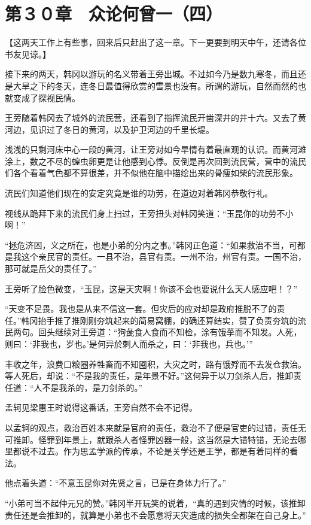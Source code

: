\section{第３０章　众论何曾一（四）}

【这两天工作上有些事，回来后只赶出了这一章。下一更要到明天中午，还请各位书友见谅。】

接下来的两天，韩冈以游玩的名义带着王旁出城。不过如今乃是数九寒冬，而且还是大旱之下的冬天，连冬日最值得欣赏的雪景也没有。所谓的游玩，自然而然的也就变成了探视民情。

王旁随着韩冈去了城外的流民营，还看到了指挥流民开凿深井的井十六。又去了黄河边，见识过了冬日的黄河，以及护卫河边的千里长堤。

浅浅的只剩河床中心一段的黄河，让王旁对如今旱情有着最直观的认识。而黄河滩涂上，数之不尽的蝗虫卵更是让他感到心悸。反倒是再次回到流民营，营中的流民们各个看着气色都不算很差，并不似他在脑中描绘出来的骨瘦如柴的流民形象。

流民们知道他们现在的安定究竟是谁的功劳，在道边对着韩冈恭敬行礼。

视线从跪拜下来的流民们身上扫过，王旁扭头对韩冈笑道：“玉昆你的功劳不小啊！”

“拯危济困，义之所在，也是小弟的分内之事。”韩冈正色道：“如果救治不当，可都是我这个亲民官的责任。一县不治，县官有责。一州不治，州官有责。一国不治，那可就是岳父的责任了。”

王旁听了脸色微变，“玉昆，这是天灾啊！你该不会也要说什么天人感应吧！？”

“天变不足畏。我也是从来不信这一套。但灾后的应对却是政府推脱不了的责任。”韩冈抬手推了推刚刚夯筑起来的简易窝棚，的确还算结实，赞了负责夯筑的流民两句。回头继续对王旁道：“狗彘食人食而不知检，涂有饿莩而不知发。人死，则曰：‘非我也，岁也。’是何异於刺人而杀之，曰：‘非我也，兵也。’”

丰收之年，浪费口粮圈养牲畜而不知囤积，大灾之时，路有饿殍而不去发仓救治。等人死后，却说：“不是我的责任，是年景不好。”这何异于以刀剑杀人后，推卸责任道：“人不是我杀的，是刀剑杀的。”

孟轲见梁惠王时说得这番话，王旁自然不会不记得。

以孟轲的观点，救治百姓本来就是官府的责任，救治不了便是官吏的过错，责任无可推卸。怪罪到年景上，就跟杀人者怪罪凶器一般，这当然是大错特错，无论去哪里都说不过去。作为思孟学派的传承，不论是关学还是王学，都是有着同样的看法。

他点着头道：“不意玉昆你对先贤之言，已是在身体力行了。”

“小弟可当不起仲元兄的赞。”韩冈半开玩笑的说着，“真的遇到灾情的时候，该推卸责任还是会推卸的，就算是小弟也不会愿意将天灾造成的损失全都架在自己身上。”

